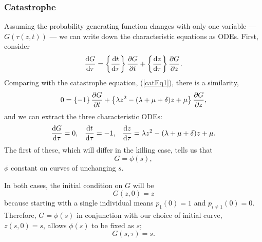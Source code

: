 \subsubsection*{Catastrophe}
Assuming the probability generating function changes with only  one variable --- $G(\tau(z, t))$ --- we can write down the characteristic equations as ODEs. First, consider
\begin{equation*}
\displaystyle\frac{{\rm d} G}{{\rm d} \tau} =  \left\{\displaystyle\frac{{\rm d} t}{{\rm d} \tau}\right\}  \displaystyle\frac{\partial G}{\partial t}+ \left\{\displaystyle\frac{{\rm d} z}{{\rm d} \tau} \right\}\displaystyle\frac{\partial G}{\partial z}.
\end{equation*}
Comparing with the catastrophe equation, (\ref{catEq1}), there is a similarity,
$$0=  \left\{- 1\right\}\displaystyle\frac{\partial G}{\partial t} + \left\{\lambda z^2 -( \lambda + \mu + \delta)z + \mu\right\} \displaystyle\frac{\partial G}{\partial z},$$
and we can extract the three characteristic ODEs:
\begin{align*}
\label{Char1}
\displaystyle\frac{{\rm d} G}{{\rm d} \tau} = 0,&& \displaystyle\frac{{\rm d} t}{{\rm d} \tau} = -1, && \displaystyle\frac{{\rm d} z}{{\rm d} \tau} = \lambda z^2 - (\lambda + \mu + \delta)z + \mu.
\end{align*}
The first of these, which will differ in the killing case, tells us that  
$$G = \phi{(s)},$$
$\phi$ constant on curves of unchanging $s$.\par
In both cases, the initial condition on $G$ will be $$G(z, 0) = z$$ because starting with a single individual means $p_1(0) =1$ and $p_{i\neq1}(0) = 0$. Therefore, $G = \phi{(s)}$ in conjunction with our choice of initial curve, $z(s, 0) = s$, allows $\phi(s)$ to be fixed as $s$;
$$G(s,\tau) = s.$$\par

